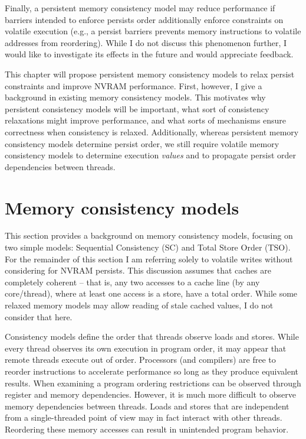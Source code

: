 Finally, a persistent memory consistency model may reduce performance if barriers intended to enforce persists order additionally enforce constraints on volatile execution (e.g., a persist barriers prevents memory instructions to volatile addresses from reordering).
While I do not discuss this phenomenon further, I would like to investigate its effects in the future and would appreciate feedback.

This chapter will propose persistent memory consistency models to relax persist constraints and improve NVRAM performance.
First, however, I give a background in existing memory consistency models.
This motivates why persistent consistency models will be important, what sort of consistency relaxations might improve performance, and what sorts of mechanisms ensure correctness when consistency is relaxed.
Additionally, whereas persistent memory consistency models determine persist order, we still require volatile memory consistency models to determine execution \emph{values} and to propagate persist order dependencies between threads.

\section{Memory consistency models}
\label{sec:PMC:MemoryConsistency}

This section provides a background on memory consistency models, focusing on two simple models: Sequential Consistency (SC) and Total Store Order (TSO).
For the remainder of this section I am referring solely to volatile writes without considering for NVRAM persists.
This discussion assumes that caches are completely coherent -- that is, any two accesses to a cache line (by any core/thread), where at least one access is a store, have a total order.
While some relaxed memory models may allow reading of stale cached values, I do not consider that here.

Consistency models define the order that threads observe loads and stores.
While every thread observes its own execution in program order, it may appear that remote threads execute out of order.
Processors (and compilers) are free to reorder instructions to accelerate performance so long as they produce equivalent results.
When examining a program ordering restrictions can be observed through register and memory dependencies.
However, it is much more difficult to observe memory dependencies between threads.
Loads and stores that are independent from a single-threaded point of view may in fact interact with other threads.
Reordering these memory accesses can result in unintended program behavior.

